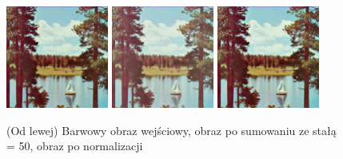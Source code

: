 \documentclass[final,a4paper,openany,12pt]{mwbk}
\begin{document}
\begin{figure}[H]
	\begin{center}
		\includegraphics[width=0.3\textwidth]{1/1Color_Const_Sum_Original}
		\includegraphics[width=0.3\textwidth]{1/1Color_Const_Sum_Result}
		\includegraphics[width=0.3\textwidth]{1/1Color_Const_Sum_Result_Norm}
	\end{center}
	\caption{(Od lewej) Barwowy obraz wejściowy, obraz po sumowaniu ze stałą = 50, obraz po normalizacji }
\end{figure}
\end{document}
